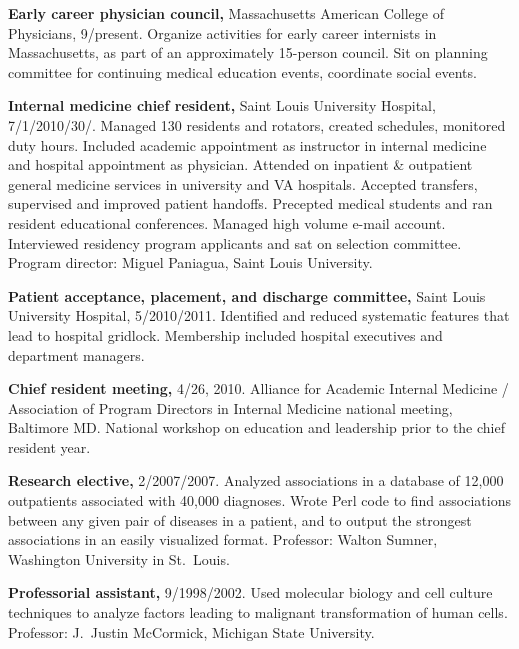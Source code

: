 \documentclass[12pt]{article}
\begin{document}
\textbf{Early career physician council,} Massachusetts American
College of Physicians,
9/\ndash{}\linebreak[0]pres\-ent. Organize activities
for early career internists in Massachusetts, as part of an
approximately 15-person council. Sit on planning committee for
continuing medical education events, coordinate social events.

\textbf{Internal medicine chief resident,} Saint Louis University
Hospital, 7/1/2010\ndash{}/30/. Managed
130 residents and rotators, created schedules, monitored duty hours.
Included academic appointment as instructor in internal medicine and
hospital appointment as physician. Attended on inpatient \& outpatient
general medicine services in university and VA hospitals. Accepted
transfers, supervised and improved patient handoffs. Precepted medical
students and ran resident educational conferences. Managed high volume
e-mail account. Interviewed residency program applicants and sat on
selection committee. Program director: Miguel Paniagua, Saint Louis
University.

\textbf{Patient acceptance, placement, and discharge committee,} Saint
Louis University Hospital, 5/2010\ndash{}/2011. Identified
and reduced systematic features that lead to hospital gridlock.
Membership included hospital executives and department managers.


\textbf{Chief resident meeting,} 4/26, 2010. Alliance for
Academic Internal Medicine / Association of Program Directors in
Internal Medicine national meeting, Baltimore MD. National workshop on
education and leadership prior to the chief resident year.

\textbf{Research elective,} 2/2007/2007. Analyzed associations
in a database of 12,000 outpatients associated with 40,000 diagnoses.
Wrote Perl code to find associations between any given pair of
diseases in a patient, and to output the strongest associations in an
easily visualized format. Professor: Walton Sumner, Washington
University in St.\ Louis.

\textbf{Professorial assistant,} 9/1998/2002. Used molecular
biology and cell culture techniques to analyze factors leading to
malignant transformation of human cells. Professor: J.\ Justin
McCormick, Michigan State University.
\end{document}
